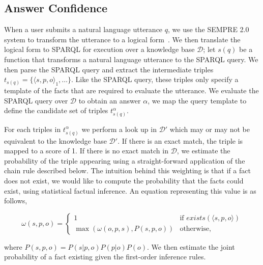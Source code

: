 

\subsection{Answer Confidence}
\label{sec:probqa-interface}

When a user submits a natural language utterance \(q\), we use the SEMPRE 2.0 system to transform the utterance to a logical form~\cite{berant2013freebase,berant2013semantic}.
We then translate the logical form to SPARQL for execution over a knowledge base \(\mathcal{D}\);
let \(s(q)\) be a function that transforms a natural language utterance to the SPARQL query.
We then parse the SPARQL query and extract the intermediate triples \( t_{s(q)} = \{\langle s,p,o\rangle_1, \ldots \}\). 
Like the SPARQL query, these triples only specify a template of the facts that are required to evaluate the utterance.
We evaluate the SPARQL query over \(\mathcal{D}\) to obtain an answer \( \alpha \), we map the query template to define the candidate set of triples \( t^\alpha_{s(q)} \).

For each triples in \( t^\alpha_{s(q)} \) we perform a look up in \(\mathcal{D'}\) which may or may not be equivalent to the knowledge base \(\mathcal{D'}\).
If there is an exact match, the triple is mapped to a score of 1.
If there is no exact match in \(\mathcal{D}\), we estimate the probability of
the triple appearing using a straight-forward application of the chain rule
described below.
The intuition behind this weighting is that if a fact does not exist, we would
like to compute the probability that the facts could exist, using statistical
factual inference.
An equation representing this value is as follows,

\begin{equation}
  \label{eq:probqa-weight}
  \omega(s,p,o) = \begin{cases}
    1 & \mbox{if } exists(\langle s,p,o \rangle) \\ 
    \max( \omega(o,p,s), P(s,p,o)) & \mbox{otherwise,}
  \end{cases}
\end{equation}

where \( P(s,p,o) = P(s|p,o)  P(p|o)  P(o) \).
We then estimate the joint probability of a fact existing given the first-order
inference rules.


